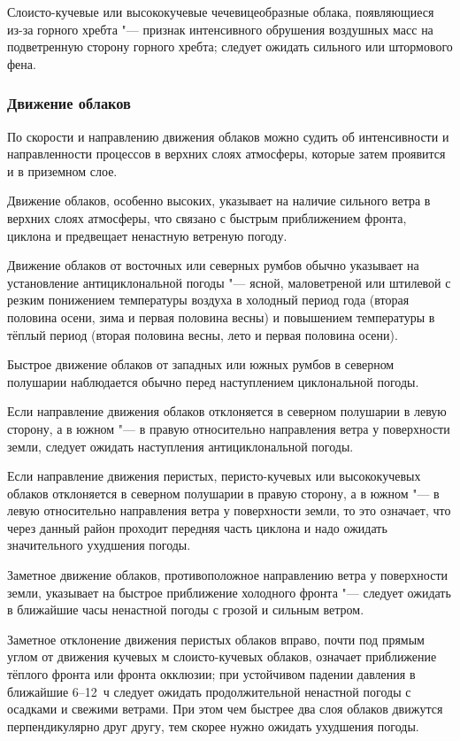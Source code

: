  Слоисто-кучевые или высококучевые чечевицеобразные облака,
появляющиеся из-за горного хребта "--- признак интенсивного обрушения
воздушных масс на подветренную сторону горного хребта; следует ожидать
сильного или штормового фена.

\subsubsection{Движение облаков}

По скорости и направлению движения облаков можно судить об
интенсивности и направленности процессов в верхних слоях атмосферы,
которые затем проявится и в приземном слое.

 Движение облаков, особенно высоких, указывает на наличие
сильного ветра в верхних слоях атмосферы, что связано с быстрым
приближением фронта, циклона и предвещает ненастную ветреную погоду.

 Движение облаков от восточных или северных румбов обычно
указывает на установление антициклональной погоды "--- ясной,
маловетреной или штилевой с резким понижением температуры воздуха в
холодный период года (вторая половина осени, зима и первая половина
весны) и повышением температуры в тёплый период (вторая половина
весны, лето и первая половина осени).

 Быстрое движение облаков от западных или южных румбов в
северном полушарии наблюдается обычно перед наступлением циклональной
погоды.

 Если направление движения облаков отклоняется в северном
полушарии в левую сторону, а в южном "--- в правую относительно направления
ветра у поверхности земли, следует ожидать наступления
антициклональной погоды.

 Если направление движения перистых, перисто-кучевых или
высококучевых облаков отклоняется в северном полушарии в правую
сторону, а в южном "--- в левую относительно направления ветра у
поверхности земли, то это означает, что через данный район проходит
передняя часть циклона и надо ожидать значительного ухудшения погоды.

 Заметное движение облаков, противоположное направлению ветра у
поверхности земли, указывает на быстрое приближение холодного
фронта "--- следует ожидать в ближайшие часы ненастной погоды с грозой и
сильным ветром.

 Заметное отклонение движения перистых облаков вправо, почти под
прямым углом от движения кучевых м слоисто-кучевых облаков, означает
приближение тёплого фронта или фронта окклюзии; при устойчивом падении
давления в ближайшие 6--12~ч следует ожидать продолжительной ненастной
погоды с осадками и свежими ветрами. При этом чем быстрее два слоя
облаков движутся перпендикулярно друг другу, тем скорее нужно ожидать
ухудшения погоды.

